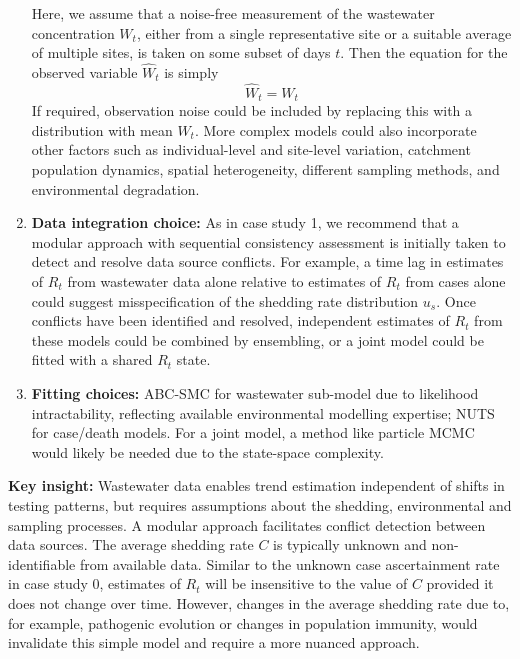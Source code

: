 \documentclass{article}
\begin{document}
\begin{enumerate}
    Here, we assume that a noise-free measurement of the wastewater concentration $W_t$, either from a single representative site or a suitable average of multiple sites, is taken on some subset of days $t$. Then the equation for the observed variable $\hat{W}_t$ is simply
    \begin{equation}
        \hat{W}_t=W_t
    \end{equation}
    If required, observation noise could be included by replacing this with a distribution with mean $W_t$. 
    More complex models could also incorporate other factors such as individual-level and site-level variation, catchment population dynamics, spatial heterogeneity, different sampling methods, and environmental degradation.
    \item \textbf{Data integration choice:} As in case study 1, we recommend that a modular approach with sequential consistency assessment is initially taken to detect and resolve data source conflicts. For example, a time lag in estimates of $R_t$ from wastewater data alone relative to estimates of $R_t$ from cases alone could suggest misspecification of the shedding rate distribution $u_s$. Once conflicts have been identified and resolved, independent estimates of $R_t$ from these models could be combined by ensembling, or a joint model could be fitted with a shared $R_t$ state. 
    \item \textbf{Fitting choices:} ABC-SMC for wastewater sub-model due to likelihood intractability, reflecting available environmental modelling expertise; NUTS for case/death models. For a joint model, a method like particle MCMC would likely be needed due to the state-space complexity.
\end{enumerate}

\textbf{Key insight:} Wastewater data enables trend estimation independent of shifts in testing patterns, but requires assumptions about the shedding, environmental and sampling processes. A modular approach facilitates conflict detection between data sources. The average shedding rate $C$ is typically unknown and non-identifiable from available data. Similar to the unknown case ascertainment rate in case study 0, estimates of $R_t$ will be insensitive to the value of $C$ provided it does not change over time. However, changes in the average shedding rate due to, for example, pathogenic evolution or changes in population immunity, would invalidate this simple model and require a more nuanced approach.  
\end{document}
